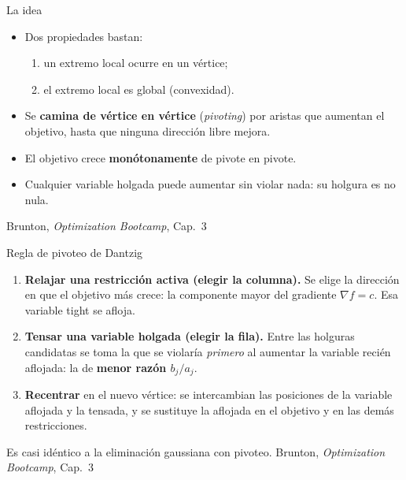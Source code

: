 \documentclass[10pt,aspectratio=169]{beamer}
\newcommand{\fuente}{\vfill{\scriptsize\color{gray}Brunton, \emph{Optimization Bootcamp}, Cap.~3}}
\begin{document}
\begin{frame}{La idea}
  \small
  \begin{itemize}
    \item Dos propiedades bastan:
      \begin{enumerate}
        \item un extremo local ocurre en un vértice;
        \item el extremo local es global (convexidad).
      \end{enumerate}
    \item Se \textbf{camina de vértice en vértice} (\emph{pivoting}) por aristas que
      aumentan el objetivo, hasta que ninguna dirección libre mejora.
    \item El objetivo crece \textbf{monótonamente} de pivote en pivote.
    \item Cualquier variable holgada puede aumentar sin violar nada:
      su holgura es no nula.
  \end{itemize}
  \fuente
\end{frame}

\begin{frame}{Regla de pivoteo de Dantzig}
  \small
  \begin{enumerate}
      \item \textbf{Relajar una restricción activa (elegir la columna).}
      Se elige la dirección en que el objetivo más crece: la componente mayor
      del gradiente $\nabla f = c$. Esa variable tight se afloja.
    \item \textbf{Tensar una variable holgada (elegir la fila).}
      Entre las holguras candidatas se toma la que se violaría \emph{primero}
      al aumentar la variable recién aflojada: la de \textbf{menor razón $b_j/a_j$}.
    \item \textbf{Recentrar} en el nuevo vértice: se intercambian las posiciones de
      la variable aflojada y la tensada, y se sustituye la aflojada en el objetivo
      y en las demás restricciones.
  \end{enumerate}
  \vfill
  {\scriptsize\color{gray}
    Es casi idéntico a la eliminación gaussiana con pivoteo.}
  \fuente
\end{frame}
\end{document}
